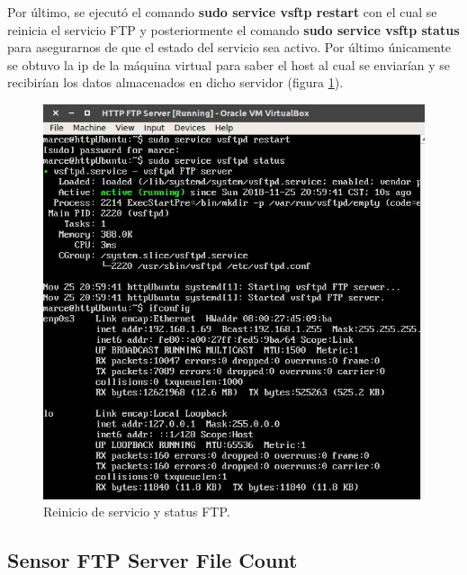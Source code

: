 Por último, se ejecutó el comando \textbf{sudo service vsftp restart} con el cual se reinicia el servicio FTP y posteriormente el comando \textbf{sudo service vsftp status} para asegurarnos de que el estado del servicio sea activo. Por último únicamente se obtuvo la ip de la máquina virtual para saber el host al cual se enviarían y se recibirían los datos almacenados en dicho servidor (figura \ref{image:ftp3}).

\FloatBarrier
\begin{figure}[htbp!]
		\centering
			\includegraphics[width=.75 \textwidth]{images/ftp3}
		\caption{Reinicio de servicio y status FTP.}
		\label{image:ftp3}
\end{figure}
\FloatBarrier
\subsection{Sensor FTP Server File Count}
